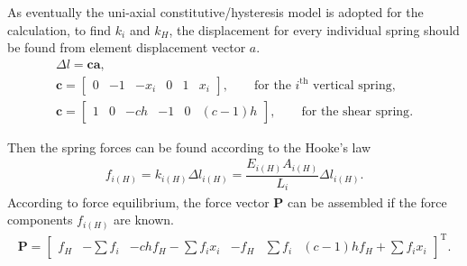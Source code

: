\documentclass[11pt]{article}
\newcommand*{\mT}{\mathrm{T}}
\begin{document}
As eventually the uni-axial constitutive/hysteresis model is adopted for the calculation, to find $k_i$ and $k_H$, the displacement for every individual spring should be found from element displacement vector $a$.
\begin{gather}
\Delta{}l=\mathbf{ca},\label{A22}\\
\mathbf{c}=\begin{bmatrix}
	0 & -1 & -x_i & 0 & 1 & x_i
\end{bmatrix},\qquad\text{for the $i^{\mathrm{th}}$ vertical spring},\\
\mathbf{c}=\begin{bmatrix}
	1 & 0 & -ch & -1 & 0 & (c-1)h
\end{bmatrix},\qquad\text{for the shear spring}.
\end{gather}

Then the spring forces can be found according to the Hooke's law
\begin{gather}
f_{i(H)}=k_{i(H)}\Delta{}l_{i(H)}=\dfrac{E_{i(H)}A_{i(H)}}{L_i}\Delta{}l_{i(H)}.\label{A23}
\end{gather}
According to force equilibrium, the force vector $\mathbf{P}$ can be assembled if the force components $f_{i(H)}$ are known.
\begin{gather}
\mathbf{P}=\begin{bmatrix}
	f_H & -\sum{}f_i & -chf_H-\sum{}f_ix_i & -f_H & \sum{}f_i & (c-1)hf_H+\sum{}f_ix_i
\end{bmatrix}^\mT.\label{A24}
\end{gather}
\end{document}
